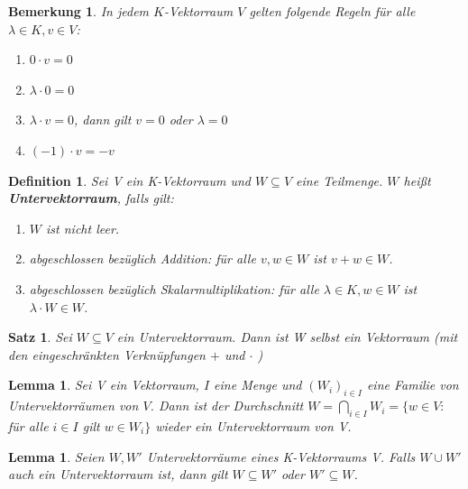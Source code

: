 \documentclass[12pt,a4paper]{article}
\theoremstyle{plain}
\newtheorem{Satz}[Theorem]{Satz}
\newtheorem{Lemma}[Theorem]{Lemma}
\newtheorem{Definition}[Theorem]{Definition}
\newtheorem{Bemerkung}[Theorem]{Bemerkung}
\newcommand{\herv}[1]{{\emph{\textbf{#1}}}}
\numberwithin{equation}{section}
\begin{document}
\begin{Bemerkung}
In jedem $K$-Vektorraum $V$ gelten folgende Regeln für alle $\lambda\in K, v\in V$:
\begin{enumerate}
\renewcommand{\labelenumi}{\alph{enumi})}
\item $0\cdot v=0$
\item $\lambda\cdot 0=0$
\item $\lambda\cdot v=0$, dann gilt $v=0$ oder $\lambda=0$
\item $(-1)\cdot v=-v$
\end{enumerate}
\end{Bemerkung}
\begin{Definition}
Sei V ein K-Vektorraum und $W\subseteq V$ eine Teilmenge. $W$ heißt \herv{Untervektorraum}, falls gilt:
\begin{enumerate}
\renewcommand{\labelenumi}{\emph{\underline{UV\arabic{enumi}}}}
\item $W$ ist nicht leer.
\item abgeschlossen bezüglich Addition: für alle $v,w\in W$ ist $v+w\in W$.
\item abgeschlossen bezüglich Skalarmultiplikation: für alle $\lambda\in K, w\in W$ ist $\lambda \cdot W\in W$.
\end{enumerate}
\end{Definition}
\begin{Satz}
Sei $W\subseteq V$ ein Untervektorraum. Dann ist W selbst ein Vektorraum (mit den eingeschränkten Verknüpfungen $+$ und $\cdot$ )
\end{Satz}
\begin{Lemma}
Sei V ein Vektorraum, $I$ eine Menge und $(W_i)_{i\in I}$ eine Familie von Untervektorräumen von $V$. Dann ist der Durchschnitt $W=\bigcap_{i\in I} W_i=\{w\in V:$ für alle $i\in I$ gilt $w\in W_i\}$ wieder ein Untervektorraum von V.
\end{Lemma}
\begin{Lemma}
Seien $W,W'$ Untervektorräume eines K-Vektorraums V. Falls $W\cup W'$ auch ein Untervektorraum ist, dann gilt $W\subseteq W'$ oder $W'\subseteq W$.
\end{Lemma}
\end{document}
